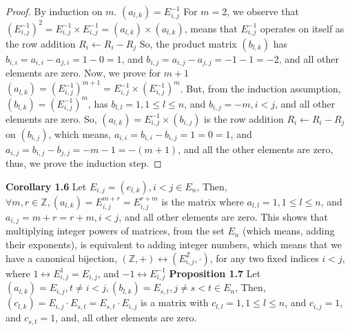 \documentclass[12pt]{article}
\begin{document}
\begin{proof}
By induction on $m$. \newline
$(a_{l,k})=E_{i,j}^{-1}$
For $m=2$, we observe that $(E_{i,j}^{-1})^2=E_{i,j}^{-1} \times E_{i,j}^{-1}=(a_{l,k}) \times (a_{l,k})$, means that $E_{i,j}^{-1}$ operates on itself as the row addition $R_i \leftarrow R_i-R_j$ \newline
So, the product matrix $(b_{l,k})$ has $b_{i,i}=a_{i,i}-a_{j,i}=1-0=1$, and $b_{i,j}=a_{i,j}-a_{j,j}=-1-1=-2$, and all other elements are zero. \newline
Now, we prove for $m+1$ \newline
$(a_{l,k})=(E_{i,j}^{-1})^{m+1}=E_{i,j}^{-1} \times (E_{i,j}^{-1})^m$. But, from the induction assumption, $(b_{l,k})=(E_{i,j}^{-1})^m$, has $b_{l,l}=1,1 \leq l \leq n$, and $b_{i,j}=-m,i<j$, and all other elements are zero. \newline
So, $(a_{l,k})=E_{i,j}^{-1} \times (b_{i,j})$ is the row addition $R_i \leftarrow R_i-R_j$ on $(b_{i,j})$, which means, $a_{i,i}=b_{i,i}-b_{i,j}=1=0=1$, and $a_{i,j}=b_{i,j}-b_{j,j}=-m-1=-(m+1)$, and all the other elements are zero, thus, we prove the induction step. \newline
\end{proof}
\textbf{Corollary 1.6} 
Let $E_{i,j}=(e_{l,k}),i<j \in E_n$, Then,\newline
$\forall m,r \in \mathbb{Z},
(a_{l,k})=E_{i,j}^{m+r}=E_{i,j}^{r+m}$ is the matrix where $a_{l,l}=1,1 \leq l \leq n$, and $a_{i,j}=m+r=r+m,i<j$, and all other elements are zero. \newline
This shows that multiplying integer powers of matrices, from the set $E_n$ (which means, adding their exponents), is equivalent to adding integer numbers, which means that we have a canonical bijection, $(\mathbb{Z},+) \leftrightarrow (E_{i,j}^{\mathbb{Z}},\cdot)$, for any two fixed indices $i<j$, where $1 \leftrightarrow E_{i,j}^1=E_{i,j}$, and $-1 \leftrightarrow E_{i,j}^{-1}$ \newline 
\newpage
\textbf{Proposition 1.7} \newline
Let $(a_{l,k})=E_{i,j},t \neq i<j,(b_{l,k})=E_{s,t},j \neq s<t \in E_n$, Then, \newline
$(c_{l,k})=E_{i,j} \cdot E_{s,t}=E_{s,t} \cdot E_{i,j}$ is a matrix with $c_{l,l}=1,1 \leq l \leq n$, and $c_{i,j}=1$, and $c_{s,t}=1$, and, all other elements are zero.
\end{document}
